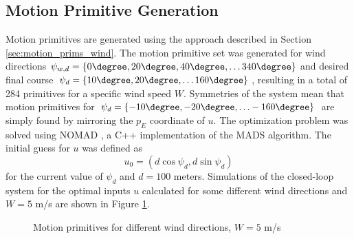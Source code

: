 \subsection{Motion Primitive Generation}
Motion primitives are generated using the approach described in Section \ref{sec:motion_prims_wind}. 
The motion primitive set was generated for wind directions $\psi_{w,d}=\{0\degree,20\degree,40\degree,\hdots340\degree\}$ and desired final course 
$\psi_d=\{10\degree,20\degree,\hdots160\degree\}$, resulting in a total of 284 primitives for a specific wind speed $W$. Symmetries of the system mean that motion primitives 
for $\psi_d=\{-10\degree,-20\degree,\hdots-160\degree\}$ are simply found by mirroring the $p_E$ coordinate of $u$.
The optimization problem was solved using NOMAD \cite{nomad}, a C++ implementation of the MADS algorithm. The initial guess for $u$ was defined as 
\begin{equation}
    u_0=(d\cos\psi_d,d\sin\psi_d)
\end{equation}
for the current value of $\psi_d$ and $d=100$ meters. 
Simulations of the closed-loop system for the optimal inputs $u$ calculated for some different wind directions and $W=5$ m/s are shown in Figure \ref{fig:motion_prims}.
\begin{figure}
    \begin{center}
    \end{center}
    \caption{Motion primitives for different wind directions, $W=5$ m/s}
    \label{fig:motion_prims}
\end{figure}

